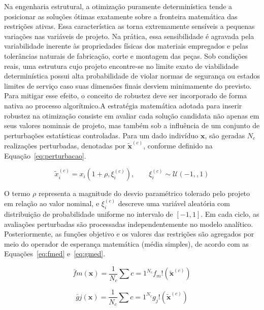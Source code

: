  Na engenharia estrutural, a otimização puramente determinística tende a posicionar as soluções ótimas exatamente sobre a fronteira matemática das restrições ativas. Essa característica as torna extremamente sensíveis a pequenas variações nas variáveis de projeto. Na prática, essa sensibilidade é agravada pela variabilidade inerente às propriedades físicas dos materiais empregados e pelas tolerâncias naturais de fabricação, corte e montagem das peças. Sob condições reais, uma estrutura cujo projeto encontre-se no limite exato de viabilidade determinística possui alta probabilidade de violar normas de segurança ou estados limites de serviço caso suas dimensões finais desviem minimamente do previsto. Para mitigar esse efeito, o conceito de robustez deve ser incorporado de forma nativa ao processo algorítmico.A estratégia matemática adotada para inserir robustez na otimização consiste em avaliar cada solução candidata não apenas em seus valores nominais de projeto, mas também sob a influência de um conjunto de perturbações estatísticas controladas. Para um dado indivíduo $\mathbf{x}$, são geradas $N_c$ realizações perturbadas, denotadas por $\tilde{\mathbf{x}}^{(c)}$, conforme definido na Equação~\eqref{eq:perturbacao}.
 
 \begin{equation}\tilde{x}_i^{(c)} = x_i \left(1 + \rho,\xi_i^{(c)}\right),\qquad \xi_i^{(c)} \sim \mathcal{U}(-1,,1)\label{eq:perturbacao}
 \end{equation}
 
 O termo $\rho$ representa a magnitude do desvio paramétrico tolerado pelo projeto em relação ao valor nominal, e $\xi_i^{(c)}$ descreve uma variável aleatória com distribuição de probabilidade uniforme no intervalo de $[-1, 1]$. Em cada ciclo, as avaliações perturbadas são processadas independentemente no modelo analítico. Posteriormente, as funções objetivo e os valores das restrições são agregados por meio do operador de esperança matemática (média simples), de acordo com as Equações~\eqref{eq:fmed} e~\eqref{eq:gmed}.
 
 \begin{equation}\bar{f}m(\mathbf{x}) = \frac{1}{N_c}\sum{c=1}^{N_c} f_m!\left(\tilde{\mathbf{x}}^{(c)}\right)
 \label{eq:fmed}
 \end{equation}
 
 \begin{equation}\bar{g}j(\mathbf{x}) = \frac{1}{N_c}\sum{c=1}^{N_c} g_j!\left(\tilde{\mathbf{x}}^{(c)}\right)
 \label{eq:gmed}
 \end{equation}
 
